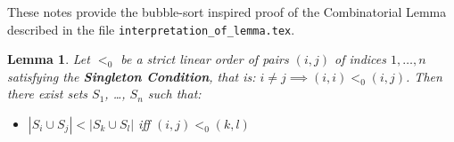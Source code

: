 \documentclass[12pt]{article}
\newtheorem{lemma}{Lemma}
\newcommand{\code}[1]{\colorbox{light-gray}{\texttt{#1}}}
\begin{document}

These notes provide the bubble-sort inspired proof of the Combinatorial Lemma described in the file \code{interpretation\_of\_lemma.tex}.

\begin{lemma}\label{Combinatorial-Lemma2}
    Let $<_0$ be a strict linear order of pairs $(i, j)$ of indices $1, \ldots, n$ satisfying the \textbf{Singleton Condition}, that is: $i \ne j \implies (i, i) <_0 (i, j)$.  Then there exist sets $S_1$, \ldots, $S_n$ such that:
    
    \begin{itemize}
        \item $|S_i \cup S_j| < |S_k \cup S_l|$ iff $(i, j) <_0 (k, l)$
    \end{itemize}
\end{lemma}
\end{document}
